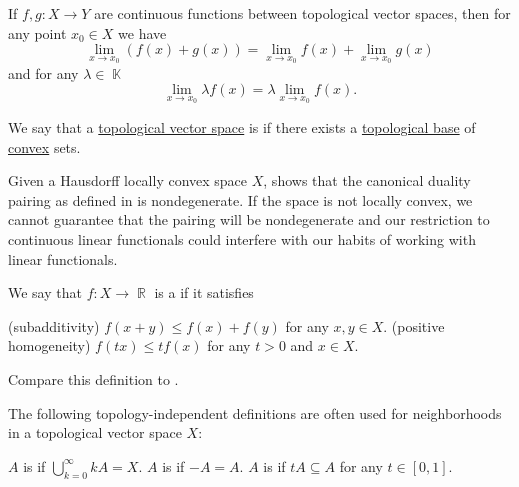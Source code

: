 \begin{corollary}\label{thm:linearity_of_function_limits}
  If \( f, g: X \to Y \) are continuous functions between topological vector spaces, then for any point \( x_0 \in X \) we have
  \begin{equation*}
    \lim_{x \to x_0} (f(x) + g(x)) = \lim_{x \to x_0} f(x) + \lim_{x \to x_0} g(x)
  \end{equation*}
  and for any \( \lambda \in \BbbK \)
  \begin{equation*}
    \lim_{x \to x_0} \lambda f(x) = \lambda \lim_{x \to x_0} f(x).
  \end{equation*}
\end{corollary}

\begin{definition}\label{def:locally_convex_space}
  We say that a \hyperref[def:topological_vector_space]{topological vector space} is  if there exists a \hyperref[def:topological_base]{topological base} of \hyperref[def:convex_hull]{convex} sets.
\end{definition}

\begin{remark}\label{def:locally_convex_duality_pairing}
  Given a Hausdorff locally convex space \( X \),  shows that the canonical duality pairing as defined in  is nondegenerate. If the space is not locally convex, we cannot guarantee that the pairing will be nondegenerate and our restriction to continuous linear functionals could interfere with our habits of working with linear functionals.
\end{remark}

\begin{definition}\label{def:sublinear_functional}
  We say that \( f: X \to \BbbR \) is a  if it satisfies
  \begin{thmenum}
    (subadditivity) \( f(x + y) \leq f(x) + f(y) \) for any \( x, y \in X \).
    (positive homogeneity) \( f(tx) \leq t f(x) \) for any \( t > 0 \) and \( x \in X \).
  \end{thmenum}

  Compare this definition to .
\end{definition}

\begin{definition}\label{def:neighborhood_set_types}
  The following topology-independent definitions are often used for neighborhoods in a topological vector space \( X \):

  \begin{thmenum}
     \( A \) is  if \( \bigcup_{k=0}^\infty kA = X \).
     \( A \) is  if \( -A = A \).
     \( A \) is  if \( tA \subseteq A \) for any \( t \in [0, 1] \).
  \end{thmenum}
\end{definition}
